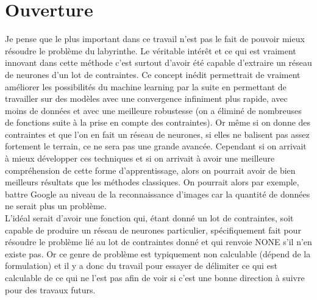 \documentclass[10pt]{article}
\begin{document}
\section{Ouverture}
Je pense que le plus important dans ce travail n'est pas le fait de pouvoir mieux résoudre le problème du labyrinthe. Le véritable intérêt et ce qui est vraiment innovant dans cette méthode c'est surtout d'avoir été capable d'extraire un réseau de neurones d'un lot de contraintes. Ce concept inédit permettrait de vraiment améliorer les possibilités du machine learning par la suite en permettant de travailler sur des modèles avec une convergence infiniment plus rapide, avec moins de données et avec une meilleure robustesse (on a éliminé de nombreuses de fonctions suite à la prise en compte des contraintes). Or même si on donne des contraintes et que l'on en fait un réseau de neurones, si elles ne balisent pas assez fortement le terrain, ce ne sera pas une grande avancée. Cependant si on arrivait à mieux développer ces techniques et si on arrivait à avoir une meilleure compréhension de cette forme d'apprentissage, alors on pourrait avoir de bien meilleurs résultats que les méthodes classiques. On pourrait alors par exemple, battre Google au niveau de la reconnaissance d'images car la quantité de données ne serait plus un problème.\\
L'idéal serait d'avoir une fonction qui, étant donné un lot de contraintes, soit capable de produire un réseau de neurones particulier, spécifiquement fait pour résoudre le problème lié au lot de contraintes donné et qui renvoie NONE s'il n'en existe pas. Or ce genre de problème est typiquement non calculable (dépend de la formulation) et il y a donc du travail pour essayer de délimiter ce qui est calculable de ce qui ne l'est pas afin de voir si c'est une bonne direction à suivre pour des travaux futurs.
\end{document}
